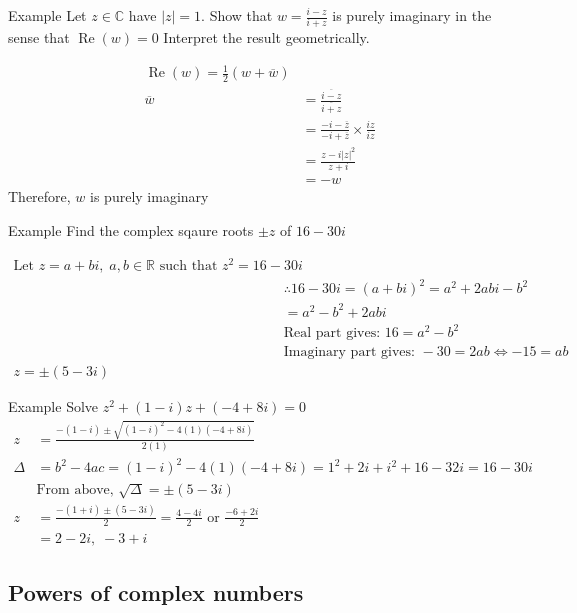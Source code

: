 \documentclass{report}
\renewcommand{\Re}{\operatorname{Re}}
\begin{document}
				\begin{question}{Example}
					Let $z \in \mathbb{C}$ have $|z| = 1$. Show that $w = \frac{i-z}{i+z}$ is purely imaginary in the sense that $\Re(w) = 0$ Interpret the result geometrically.

					\begin{align*}
						\Re(w) = \frac{1}{2} (w + \overline{w})		\\
						\overline{w} &= \frac{\overline{i-z}}{\overline{i+z}}	\\
									 &= \frac{-i-\overline{z}}{-i+\overline{z}} \times \frac{iz}{iz}	\\
									 &= \frac{z-i|z|^2}{z+i}		\\
									 &= -w
					\end{align*}
					Therefore, $w$ is purely imaginary
				\end{question}
				\begin{question}{Example}
					Find the complex sqaure roots $\pm z$ of $16-30i$

					\begin{align*}
						\text{Let } z = a+bi,\; a,b \in \mathbb{R} \text{ such that } z^2 = 16-30i	\\
						&\therefore 16-30i = (a+bi)^2 = a^2 + 2abi - b^2	\\
						&= a^2 - b^2 + 2abi	\\
						&\text{Real part gives: }16 = a^2 - b^2	\\
						&\text{Imaginary part gives: } -30 = 2ab \Leftrightarrow -15=ab	\\
						z = \pm (5-3i)
					\end{align*}
				\end{question}
				\begin{question}{Example}
					Solve $z^2 + (1-i)z + (-4+8i) = 0$
					\begin{align*}
						z &= \frac{-(1-i) \pm \sqrt{(1-i)^2 - 4(1)(-4+8i)}}{2(1)}	\\
						\Delta &= b^2 - 4ac = (1-i)^2 - 4(1)(-4+8i) = 1^2 + 2i + i^2 + 16 - 32i = 16-30i	\\
							   &\text{From above, } \sqrt{\Delta} = \pm (5-3i)		\\
						z &= \frac{-(1+i) \pm (5-3i)}{2} = \frac{4 - 4i}{2} \text{ or } \frac{-6+2i}{2}		\\
						  &= 2-2i, \; -3+i
					\end{align*}
				\end{question}

		\subsection{Powers of complex numbers}
\end{document}
